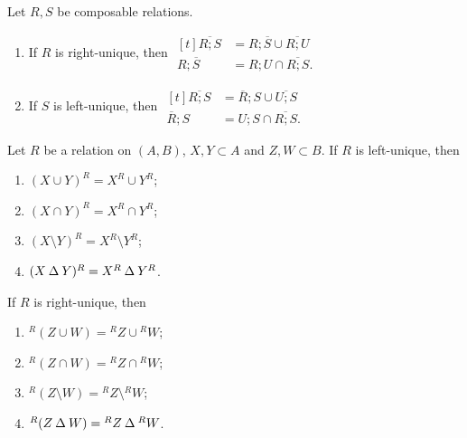 \begin{lemma}
Let $R,S$ be composable relations.
\begin{enumerate}
\item If $R$ is right-unique, then $\begin{aligned}[t]
\overline{R;S} &= R;\overline{S} \cup \overline{R;U} \\
R;\overline{S} &= R;U\cap \overline{R;S}.
\end{aligned}$
\item If $S$ is left-unique, then $\begin{aligned}[t]
\overline{R;S} &= \overline{R};S \cup \overline{U;S} \\
\overline{R};S &= U;S\cap \overline{R;S}.
\end{aligned}$
\end{enumerate}
\end{lemma}

\begin{lemma} \label{imagePreimageUniqueness}
Let $R$ be a relation on $(A, B)$, $X,Y\subset A$ and $Z,W\subset B$. If $R$ is left-unique, then
\begin{enumerate}
\item $(X\cup Y)^R = X^R\cup Y^R$;
\item $(X\cap Y)^R = X^R\cap Y^R$;
\item $(X\setminus Y)^R = X^R\setminus Y^R$;
\item $(X\mathbin{\Delta} Y)^R = X^R\mathbin{\Delta} Y^R$.
\end{enumerate}
If $R$ is right-unique, then
\begin{enumerate}
\item $^R(Z\cup W) = {^RZ}\cup {^RW}$;
\item $^R(Z\cap W) = {^RZ}\cap {^RW}$;
\item $^R(Z\setminus W) = {^RZ}\setminus {^RW}$;
\item $^R(Z\mathbin{\Delta} W) = {^RZ}\mathbin{\Delta} {^RW}$.
\end{enumerate}
\end{lemma}

